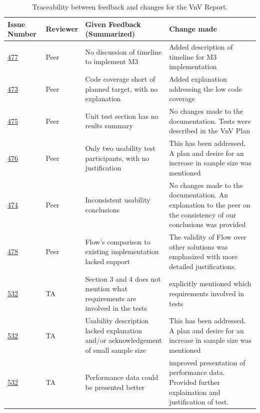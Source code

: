 \documentclass{article}
\begin{document}
\begin{table}[H]
\centering
\begin{tabularx}{\textwidth}{p{1.3cm} l X X}
\toprule
Issue Number & Reviewer & Given Feedback (Summarized) & Change made  \\
\midrule
\href{https://github.com/ritual-17/flow/issues/477}{477} & Peer & No discussion of timeline to implement M3 & Added description of timeline
for M3 implementation \\
\href{https://github.com/ritual-17/flow/issues/473}{473} & Peer & Code coverage short of planned target, with no explanation & Added
explanation addressing the low code coverage \\
\href{https://github.com/ritual-17/flow/issues/475}{475} & Peer & Unit test section has no reults summary & No changes made to the
documentation. Tests were described in the VnV Plan \\
\href{https://github.com/ritual-17/flow/issues/476}{476} & Peer & Only two usability test participants, with no justification & This has been
addressed. A plan and desire for an increase in sample size was mentioned  \\
\href{https://github.com/ritual-17/flow/issues/474}{474} & Peer & Inconsistent usability conclusions & No changes made to the documentation.
An explanation to the peer on the consistency of our conclusions was provided \\
\href{https://github.com/ritual-17/flow/issues/478}{478} & Peer & Flow's comparison to existing implementation lacked support & The validity
of Flow over other solutions was emphasized with more detailed justifications. \\
\href{https://github.com/ritual-17/flow/issues/532}{532} & TA & Section 3 and 4 does not mention what requirements are involved in the tests
& explicitly mentioned which requirements involved in tests  \\
\href{https://github.com/ritual-17/flow/issues/532}{532} & TA & Usability description lacked explanation and/or acknowledgement of small
sample size & This has been addressed. A plan and desire for an increase in sample
size was mentioned  \\
\href{https://github.com/ritual-17/flow/issues/532}{532} & TA & Performance data could be presented better & improved presentation of
performance data. Provided further explaination and justification of test. \\
\bottomrule
\end{tabularx}
\caption{Traceability between feedback and changes for the VnV Report.}
\end{table}
\end{document}
